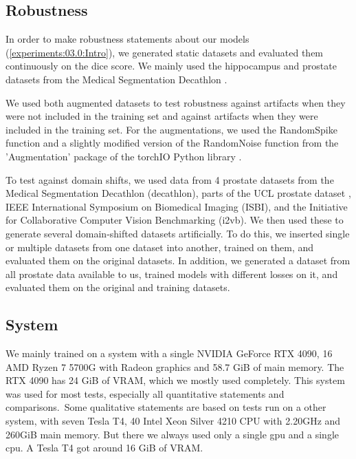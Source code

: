 \subsection*{Robustness}
\label{methods:Robust}

In order to make robustness statements about our models (\autoref{experiments:03.0:Intro}), we generated static datasets and evaluated them continuously on the dice score. We mainly used the hippocampus and prostate datasets from the Medical Segmentation Decathlon \cite{Antonelli:2022:MedSegmentationDecatlon}. 

We used both augmented datasets to test robustness against artifacts when they were not included in the training set and against artifacts when they were included in the training set. For the augmentations, we used the RandomSpike function and a slightly modified version of the RandomNoise function from the 'Augmentation' package of the torchIO Python library \cite{torchIO}.

To test against domain shifts, we used data from 4 prostate datasets from the  
Medical Segmentation Decathlon \cite{Antonelli:2022:MedSegmentationDecatlon} (decathlon), 
parts of the UCL prostate dataset \cite{Ahmed:2017:UCL_PROMIS},
IEEE International Symposium on Biomedical Imaging \cite{Bloch:2015:ISBI_Data, Clark:2013:ISBI_TCIA} (ISBI), and the
Initiative for Collaborative Computer Vision Benchmarking \cite{Lematre:2015:i2cvb} (i2vb). We then used these to generate several domain-shifted datasets artificially. To do this, we inserted single or multiple datasets from one dataset into another, trained on them, and evaluated them on the original datasets. In addition, we generated a dataset from all prostate data available to us, trained models with different losses on it, and evaluated them on the original and training datasets.


\subsection*{System}
\label{experiments:intro:system}
We mainly trained on a system with a single NVIDIA GeForce RTX 4090, 16 AMD Ryzen 7 5700G with Radeon graphics and 58.7 GiB of main memory. The RTX 4090 has 24 GiB of VRAM, which we mostly used completely. This system was used for most tests, especially all quantitative statements and comparisons.\
Some qualitative statements are based on tests run on a other system, with seven Tesla T4, 40 Intel Xeon Silver 4210 CPU with 2.20GHz and 260GiB main memory. But there we always used only a single gpu and a single cpu. A Tesla T4 got around 16 GiB of VRAM. 


